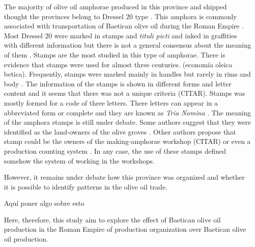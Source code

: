 \documentclass[review]{elsarticle}
\begin{document}
The majority of olive oil amphorae produced in this province and shipped thought the provinces belong to Dressel 20 type \citep{dressel,martin-kilcher_romischen_1994}. This amphora is commonly associated with transportation of Baetican olive oil during the Roman Empire \citep{berni_millet_epigrafianforica_2008}. Most Dressel 20 were marked in stamps and \textit{tituli picti} and inked in graffities with different information but there is not a general consensus about the meaning of them \citep{rodriguez_baetican_1998}. Stamps are the most studied in this type of amphorae. There is evidence that stamps were used for almost three centuries. (economía oleica betica). Frequently, stamps were marked mainly in handles but rarely in rims and body \citep{millet_anforas_1998}. 
The information of the stamps is shown in different forms and letter content and it seems that there was not a unique criteria (CITAR). Stamps was mostly formed for a code of three letters. There letters can appear in a abbreviated form or complete and they are known as \textit{Tria Nomina} \citep{berni_millet_amphora_1996}. 
The meaning of the amphora stamps is still under debate. Some authors suggest that they were identified as the land-owners of the olive groves \citep{rodriguez_economioleicola_1977}. Other authors propose that stamp could be the owners of the making-amphorae workshop (CITAR) or even a production counting system \citep{berni_millet_epigrafianforica_2008}. In any case, the use of these stamps defined somehow the system of working in the workshops. 



However, it remains under debate how this province was organized and whether it is possible to identify patterns in the olive oil trade. 







Aquí poner algo sobre esto \citep{remesal_anforas_2004}

Here, therefore, this study aim to explore the effect of Baetican olive oil production in the Roman Empire
of production organization over Baetican olive oil production. 
\end{document}
